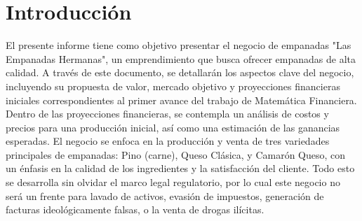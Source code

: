 \documentclass[12pt]{article}
\begin{document}

\section{Introducción} %
El presente informe tiene como objetivo presentar el negocio de empanadas "Las Empanadas Hermanas", un emprendimiento que busca ofrecer empanadas de alta calidad. A través de este documento, se detallarán los aspectos clave del negocio, incluyendo su propuesta de valor, mercado objetivo y proyecciones financieras iniciales correspondientes al primer avance del trabajo de Matemática Financiera. \\

Dentro de las proyecciones financieras, se contempla un análisis de costos y precios para una producción inicial, así como una estimación de las ganancias esperadas. El negocio se enfoca en la producción y venta de tres variedades principales de empanadas: Pino (carne), Queso Clásica, y Camarón Queso, con un énfasis en la calidad de los ingredientes y la satisfacción del cliente. Todo esto se desarrolla sin olvidar el marco legal regulatorio, por lo cual este negocio no será un frente para lavado de activos, evasión de impuestos, generación de facturas ideológicamente falsas, o la venta de drogas ilícitas. \\ %
\end{document}
